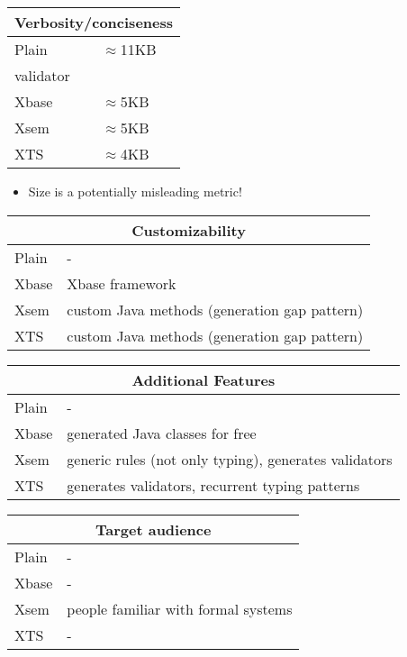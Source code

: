 \begin{tabularx}{\linewidth}{ l   X }
\multicolumn{2}{c}{Verbosity/conciseness} \\ \hline
Plain & $\approx$11KB \\%
validator \\
Xbase &$\approx$5KB \\%
Xsem & $\approx$5KB \\%
XTS & $\approx$4KB \\%
\end{tabularx}

\begin{itemize}
  \item Size is a potentially misleading metric! 
\end{itemize}


\begin{tabularx}{\linewidth}{ l   X }
\multicolumn{2}{c}{Customizability} \\ \hline
Plain & - \\
Xbase & Xbase framework \\
Xsem & custom Java methods (generation gap pattern)\\
XTS & custom Java methods (generation gap pattern) \\
\end{tabularx}

\begin{tabularx}{\linewidth}{ l   X }
\multicolumn{2}{c}{Additional Features} \\ \hline
Plain & - \\
Xbase & generated Java classes for free \\
Xsem & generic rules (not only typing), generates validators \\
XTS & generates validators, recurrent typing patterns \\
\end{tabularx}

\begin{tabularx}{\linewidth}{ l   X }
\multicolumn{2}{c}{Target audience} \\ \hline
Plain & - \\
Xbase & - \\
Xsem & people familiar with formal systems \\
XTS & - \\
\end{tabularx}

